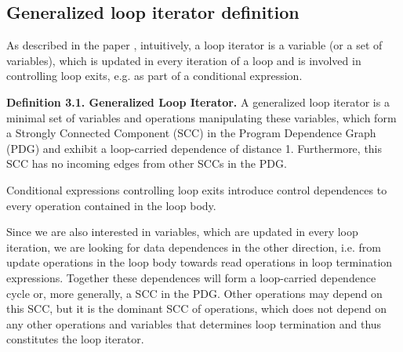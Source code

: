 \subsection{Generalized loop iterator definition}
\qquad As described in the paper \cite{iterator-recognition-paper}, intuitively, a loop iterator is a variable (or a set of variables),
which is updated in every iteration of a loop and is involved in controlling loop exits, e.g. as part of a conditional expression.\newline

\textbf{Definition 3.1. Generalized Loop Iterator.} A generalized loop iterator is a minimal set of variables and operations manipulating these variables, which form a Strongly Connected Component (SCC) in the Program Dependence Graph (PDG) and exhibit a loop-carried dependence of distance 1. Furthermore, this SCC has no incoming edges from other SCCs in the PDG.\newline

Conditional expressions controlling loop exits introduce control dependences to every operation contained in the loop body. 

Since we are also interested in variables, which are updated in every loop
iteration, we are looking for data dependences in the other direction, i.e. from update operations in the loop body towards read operations in loop termination expressions. Together these dependences will form a loop-carried dependence cycle or, more generally, a SCC in the PDG. Other operations may depend on this SCC, but it is the dominant SCC of operations, which does not depend on any other operations and variables that determines loop termination and thus constitutes the loop iterator.

